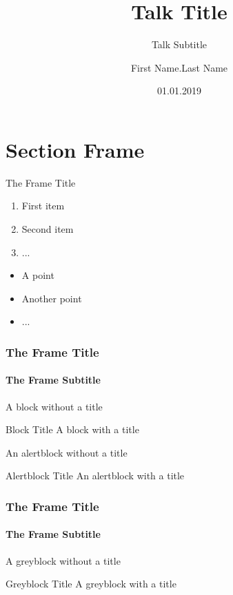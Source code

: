 \documentclass[14pt]{beamer}
\title[Small Title]{Talk Title}
\subtitle{Talk Subtitle}
\author{First Name.Last Name}
\institute[Inst]{Institute}
\date{01.01.2019}
\begin{document}
\begin{frame}[plain]
  \maketitle
\end{frame}

\section{Section Frame}
\frame{\sectionpage}

\begin{frame}{The Frame Title}

  \begin{enumerate}
    \item First item
    \item Second item
    \item ...
  \end{enumerate}

  \vfill

  \begin{itemize}
    \item A point
    \item Another point
    \item ...
  \end{itemize}
  
\end{frame}

\begin{frame}
  \frametitle{The Frame Title}
  \framesubtitle{The Frame Subtitle}

  \begin{block}{}
    A block without a title
  \end{block}

  \begin{block}{Block Title}
    A block with a title
  \end{block}
  
  \begin{alertblock}{}
    An alertblock without a title
  \end{alertblock}

  \begin{alertblock}{Alertblock Title}
    An alertblock with a title
  \end{alertblock}

\end{frame}

\begin{frame}
  \frametitle{The Frame Title}
  \framesubtitle{The Frame Subtitle}

  \begin{greyblock}{}
    A greyblock without a title
  \end{greyblock}

  \vfill

  \begin{greyblock}{Greyblock Title}
    A greyblock with a title
  \end{greyblock}

\end{frame}
\end{document}
